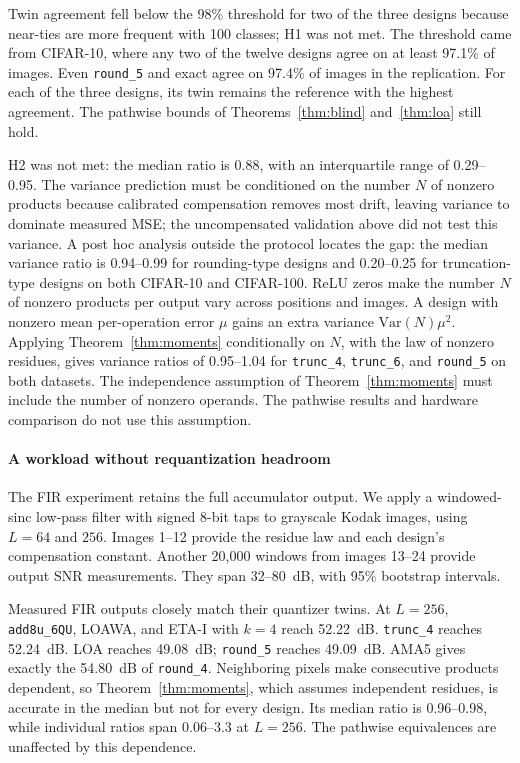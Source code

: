 \documentclass[preprint,12pt,numbers]{elsarticle}
\theoremstyle{definition}
\begin{document}
Twin agreement fell below the 98\% threshold for two of the three
designs because near-ties are more frequent with 100 classes; H1 was
not met. The threshold came from CIFAR-10, where any two of the twelve
designs agree on at least 97.1\% of images. Even \texttt{round\_5} and
exact agree on 97.4\% of images in the replication.
For each of the three designs, its twin remains the reference with
the highest agreement. The pathwise bounds of
Theorems~\ref{thm:blind} and~\ref{thm:loa} still hold.

H2 was not met: the median ratio is 0.88, with an interquartile range
of 0.29--0.95. The variance prediction must be conditioned on the
number $N$ of nonzero products because calibrated compensation removes most
drift, leaving variance to dominate measured MSE; the uncompensated
validation above did not test this variance. A post hoc analysis
outside the protocol locates the gap: the median variance ratio is 0.94--0.99 for
rounding-type designs and 0.20--0.25 for truncation-type designs on
both CIFAR-10 and CIFAR-100. ReLU zeros make the number $N$ of nonzero
products per output vary across positions and images. A design with
nonzero mean per-operation error $\mu$ gains an extra variance
$\mathrm{Var}(N)\mu^2$. Applying Theorem~\ref{thm:moments}
conditionally on $N$, with the law of nonzero residues, gives
variance ratios of 0.95--1.04 for \texttt{trunc\_4},
\texttt{trunc\_6}, and \texttt{round\_5} on both datasets.
The independence assumption of Theorem~\ref{thm:moments} must
include the number of nonzero operands. The pathwise results and
hardware comparison do not use this assumption.

\paragraph{A workload without requantization headroom}
The FIR experiment retains the full accumulator output. We apply a
windowed-sinc low-pass filter with signed 8-bit taps to grayscale
Kodak images, using $L=64$ and $256$. Images 1--12 provide the
residue law and each design's compensation constant. Another 20{,}000
windows from images 13--24 provide output SNR measurements.
They span 32--80~dB, with 95\% bootstrap intervals.

Measured FIR outputs closely match their quantizer twins. At $L=256$,
\texttt{add8u\_6QU}, LOAWA, and ETA-I with $k=4$ reach 52.22~dB.
\texttt{trunc\_4} reaches 52.24~dB. LOA reaches 49.08~dB;
\texttt{round\_5} reaches 49.09~dB. AMA5 gives exactly the
54.80~dB of \texttt{round\_4}. Neighboring pixels make consecutive
products dependent, so Theorem~\ref{thm:moments}, which assumes
independent residues, is accurate in the median but not for every design.
Its median ratio is 0.96--0.98, while individual ratios span 0.06--3.3
at $L=256$. The pathwise equivalences are unaffected by this
dependence.
\end{document}
